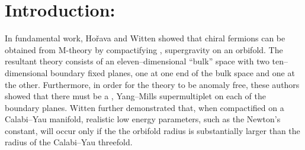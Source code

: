 \documentclass[a4paper,12pt]{article}
\numberwithin{equation}{section}
\theoremstyle{plain}
\begin{document}

\section{Introduction:}


In fundamental work, Ho\v rava and Witten \cite{HW1, HW2} 
showed that chiral fermions can be
obtained from M-theory by compactifying \coordHE{}, \coordHE{} supergravity on an
\coordHE{} orbifold. The resultant theory consists of an
eleven--dimensional ``bulk'' space with two ten--dimensional boundary fixed
planes, one at one end of the bulk space and one at the other. Furthermore, in
order for the theory to be anomaly free, these authors showed that there must 
be a \coordHE{}, \coordHE{}  \coordHE{} Yang--Mills supermultiplet on each of the boundary
planes. Witten \cite{W} further demonstrated that, 
when compactified on a
Calabi--Yau manifold, realistic low energy parameters,
such as the \coordHE{} Newton's constant, will occur only if the the orbifold
radius is substantially larger than the radius of the Calabi--Yau threefold.
\end{document}
